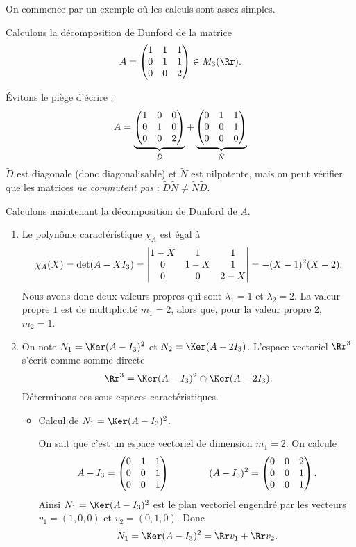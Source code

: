\documentclass[12pt, class=report,crop=false]{standalone}
\begin{document}
On commence par un exemple où les calculs sont assez simples.
\begin{exemple}
Calculons la décomposition de Dunford de la matrice 
$$A=\begin{pmatrix}1&1&1\cr 0&1&1\cr 0&0&2\end{pmatrix} \in M_3(\Rr).$$


\'Evitons le piège d'écrire :
$$A=\underbrace{\begin{pmatrix}1&0&0\cr 0&1&0\cr 0&0&2\end{pmatrix}}_{\tilde D}
+\underbrace{\begin{pmatrix}0&1&1\cr 0&0&1\cr 0&0&0\end{pmatrix}}_{\tilde N}$$
$\tilde D$ est diagonale (donc diagonalisable) et $\tilde N$ est nilpotente,
mais on peut vérifier que les matrices \emph{ne commutent pas} :  
$\tilde D \tilde N \neq \tilde N \tilde D$.

\bigskip 
Calculons maintenant la décomposition de Dunford de $A$.

\begin{enumerate}
  \item Le polynôme caractéristique $\chi_A$ est égal à
$$\chi_A(X) 
= \det(A-XI_3) 
= \begin{vmatrix}1-X & 1 & 1\cr 0 & 1-X & 1\cr 0 & 0 & 2-X\end{vmatrix}
= -(X-1)^2(X-2).$$
Nous avons donc deux valeurs propres qui sont $\lambda_1 = 1$ et $\lambda_2 = 2$. 
La valeur propre $1$ est de multiplicité $m_1=2$, alors que, pour la valeur propre $2$, $m_2=1$.

  \item On note $N_1 = \Ker(A-I_3)^2$ et $N_2 = \Ker(A-2I_3)$. 
 L'espace vectoriel $\Rr^3$ s'écrit comme somme directe
$$\Rr^3=\Ker(A-I_3)^2\oplus\Ker(A-2I_3).$$
Déterminons ces sous-espaces caractéristiques. 
  \begin{itemize}
    \item Calcul de $N_1 = \Ker(A-I_3)^2$.
    
  On sait que c'est un espace vectoriel de dimension $m_1=2$. On calcule
$$A-I_3 = \begin{pmatrix}0&1&1\cr0&0&1\cr0&0&1\end{pmatrix}\qquad \qquad 
(A-I_3)^2 = \begin{pmatrix}0&0&2\cr0&0&1\cr0&0&1\end{pmatrix}.$$
Ainsi $N_1 = \Ker(A-I_3)^2$ est le plan vectoriel engendré par les vecteurs $v_1=(1,0,0)$ et $v_2=(0,1,0)$.
Donc 
$$N_1=\Ker(A-I_3)^2=\Rr v_1 + \Rr v_2.$$


\end{itemize}
\end{enumerate}
\end{exemple}
\end{document}
